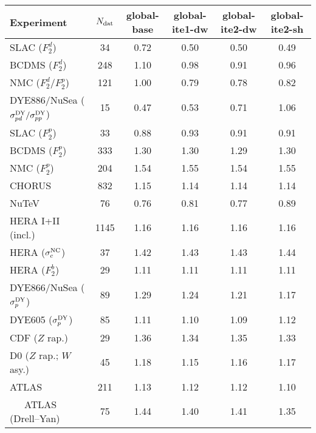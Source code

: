 \begin{table}[!t]
  \centering
  \scriptsize
  \renewcommand{\arraystretch}{1.13}
  \begin{tabularx}{\textwidth}{lCCCCC}
    \toprule 
    \textbf{Experiment}
    &  \textbf{$N_{\rm dat}$} &  \textbf{global-base} &  \textbf{global-ite1-dw} &  
    \textbf{global-ite2-dw} &  \textbf{global-ite2-sh} \\
    \midrule
    SLAC  ($F_2^d$)
    &         34 & 0.72 & 0.50 & 0.50 & 0.49 \\
    BCDMS ($F_2^d$)
    &        248 & 1.10 & 0.98 & 0.91 & 0.96 \\
    NMC   ($F_2^d/F_2^p$)
    &        121 & 1.00 & 0.79 & 0.78 & 0.82 \\
    DYE886/NuSea ($\sigma_{pd}^{\rm DY}/\sigma_{pp}^{\rm DY}$)
    &         15 & 0.47 & 0.53 & 0.71 & 1.06 \\
    \midrule
    SLAC  ($F_2^p$)
    &         33 & 0.88 & 0.93 & 0.91 & 0.91 \\
    BCDMS ($F_2^p$)
    &        333 & 1.30 & 1.30 & 1.29 & 1.30 \\
    NMC   ($F_2^p$)
    &        204 & 1.54 & 1.55 & 1.54 & 1.55 \\
    CHORUS
    &        832 & 1.15 & 1.14 & 1.14 & 1.14 \\
    NuTeV
    &         76 & 0.76 & 0.81 & 0.77 & 0.89 \\
    HERA I+II (incl.)
    &       1145 & 1.16 & 1.16 & 1.16 & 1.16 \\
    HERA ($\sigma_c^{\rm NC}$)
    &         37 & 1.42 & 1.43 & 1.43 & 1.44 \\
    HERA ($F_2^b$)
    &         29 & 1.11 & 1.11 & 1.11 & 1.11 \\
    DYE866/NuSea ($\sigma_{p}^{\rm DY}$)
    &         89 & 1.29 & 1.24 & 1.21 & 1.17 \\
    DYE605 ($\sigma_{p}^{\rm DY}$)
    &         85 & 1.11 & 1.10 & 1.09 & 1.12 \\
    CDF ($Z$ rap.)
    &         29 & 1.36 & 1.34 & 1.35 & 1.33 \\
    D0 ($Z$ rap.; $W$ asy.)
    &         45 & 1.18 & 1.15 & 1.16 & 1.17 \\
    ATLAS 
    &        211 & 1.13 & 1.12 & 1.12 & 1.10 \\
    \ \ \ ATLAS (Drell--Yan)
    &         75 & 1.44 & 1.40 & 1.41 & 1.35 \\

\end{tabularx}
\end{table}
